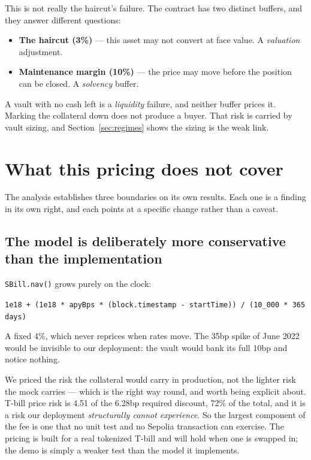 \documentclass[11pt,a4paper]{article}
\begin{document}
This is not really the haircut's failure. The contract has two distinct buffers, and they
answer different questions:

\begin{itemize}
\item \textbf{The haircut (3\%)} — this asset may not convert at face value. A
      \emph{valuation} adjustment.
\item \textbf{Maintenance margin (10\%)} — the price may move before the position can be
      closed. A \emph{solvency} buffer.
\end{itemize}

A vault with no cash left is a \emph{liquidity} failure, and neither buffer prices it.
Marking the collateral down does not produce a buyer. That risk is carried by vault
sizing, and Section~\ref{sec:regimes} shows the sizing is the weak link.

\section{What this pricing does not cover}
\label{sec:limits}

The analysis establishes three boundaries on its own results. Each one is a finding in
its own right, and each points at a specific change rather than a caveat.

\subsection{The model is deliberately more conservative than the implementation}

\texttt{SBill.nav()} grows purely on the clock:

\begin{center}
\texttt{1e18 + (1e18 * apyBps * (block.timestamp - startTime)) / (10\_000 * 365 days)}
\end{center}

A fixed 4\%, which never reprices when rates move. The 35bp spike of June 2022 would be
invisible to our deployment: the vault would bank its full 10bp and notice nothing.

We priced the risk the collateral would carry in production, not the lighter risk the
mock carries — which is the right way round, and worth being explicit about. T-bill price
risk is 4.51 of the 6.28bp required discount, 72\% of the total, and it is a risk our
deployment \emph{structurally cannot experience}. So the largest component of the fee is
one that no unit test and no Sepolia transaction can exercise. The pricing is built for a
real tokenized T-bill and will hold when one is swapped in; the demo is simply a weaker
test than the model it implements.
\end{document}
